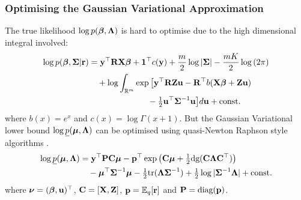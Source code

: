 \documentclass{beamer}
\begin{document}
	\begin{frame}
		\frametitle{Optimising the Gaussian Variational Approximation}
		The true likelihood $\log p({\boldsymbol \beta}, {\boldsymbol \Lambda})$ is hard to optimise due 
		to the high dimensional integral involved:
		\begin{align*}
			\log p({\boldsymbol \beta}, {\boldsymbol \Sigma} | {\bf r}) & = {\bf y}^\top {\bf R} {\bf X} {\boldsymbol\beta} + {\bf 1}^\top c({\bf y}) + \frac{m}{2} \log |{\boldsymbol \Sigma}| - \frac{mK}{2} \log{(2 \pi)}    \\
			                               & \quad + \log  \int_{\mathbb{R}^{m}} \exp \big[ {\bf y}^\top {\bf R} {\bf Z} {\bf u} - {\bf R}^\top b( {\bf X} {\boldsymbol \beta} + {\bf Z} {\bf u})   \\
			                               & \quad \quad \quad \quad \quad \quad \quad - \tfrac{1}{2} {{\bf u}^\top {\boldsymbol\Sigma}^{-1} {\bf u} } \big] d {\bf u} + \text{const.} 
		\end{align*}
		where $b(x) = e^x$ and $c(x) = \log \Gamma(x + 1)$. But the Gaussian Variational lower bound $\log
		\underline{p}({\boldsymbol \mu}, {\boldsymbol \Lambda})$ can be optimised using quasi-Newton Raphson style algorithms 
		\cite{Nocedal2006}.
		\begin{align*}		                                   
			\log \underline{p}({\boldsymbol \mu}, {\boldsymbol \Lambda}) & = {\bf y}^\top {\bf P} {\bf C} {\boldsymbol\mu} - {\bf p}^\top \exp{\left({\bf C}{\boldsymbol\mu}+  \tfrac{1}{2} \mbox{dg}{({\bf C}{\boldsymbol\Lambda}{\bf C}^\top)}\right)}                         \\
			                                   & \quad - {\boldsymbol \mu}^\top {\boldsymbol\Sigma}^{-1} {\boldsymbol \mu} - \tfrac{1}{2} \text{tr}{({\boldsymbol\Lambda}{\boldsymbol\Sigma}^{-1})} + \tfrac{1}{2} \log{|{\boldsymbol\Sigma}^{-1}{\boldsymbol\Lambda}|} + \text{const.} 
		\end{align*}
		where ${\boldsymbol \nu} = ({\boldsymbol \beta}, {\bf u})^\top$, ${\bf C} = [{\bf X}, {\bf Z}]$, ${\bf p} = \mathbb{E}_q[{\bf r}]$ and ${\bf P} = \text{diag}({\bf p})$.
	\end{frame}
			
	\def\checkmark{\tikz\fill[scale=0.4](0,.35) -- (.25,0) -- (1,.7) -- (.25,.15) -- cycle;}
			
\end{document}
